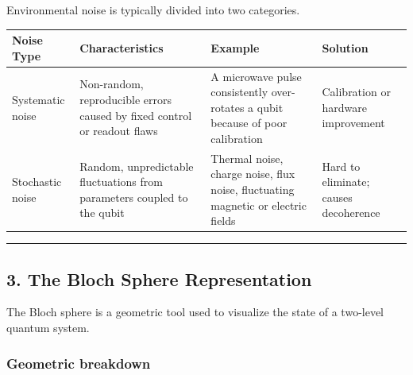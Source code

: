 \documentclass[
]{article}
\begin{document}
Environmental noise is typically divided into two categories.

\begin{longtable}[]{@{}
  >{\raggedright\arraybackslash}p{}
  >{\raggedright\arraybackslash}p{}
  >{\raggedright\arraybackslash}p{}
  >{\raggedright\arraybackslash}p{}@{}}
\toprule\noalign{}
\begin{minipage}[b]{\linewidth}\raggedright
Noise Type
\end{minipage} & \begin{minipage}[b]{\linewidth}\raggedright
Characteristics
\end{minipage} & \begin{minipage}[b]{\linewidth}\raggedright
Example
\end{minipage} & \begin{minipage}[b]{\linewidth}\raggedright
Solution
\end{minipage} \\
\midrule\noalign{}
\endhead
\bottomrule\noalign{}
\endlastfoot
Systematic noise & Non-random, reproducible errors caused by fixed
control or readout flaws & A microwave pulse consistently over-rotates a
qubit because of poor calibration & Calibration or hardware
improvement \\
Stochastic noise & Random, unpredictable fluctuations from parameters
coupled to the qubit & Thermal noise, charge noise, flux noise,
fluctuating magnetic or electric fields & Hard to eliminate; causes
decoherence \\
\end{longtable}

\begin{center}\rule{0.5\linewidth}{0.5pt}\end{center}

\subsection{3. The Bloch Sphere
Representation}\label{the-bloch-sphere-representation}

The Bloch sphere is a geometric tool used to visualize the state of a
two-level quantum system.

\subsubsection{Geometric breakdown}\label{geometric-breakdown}
\end{document}
